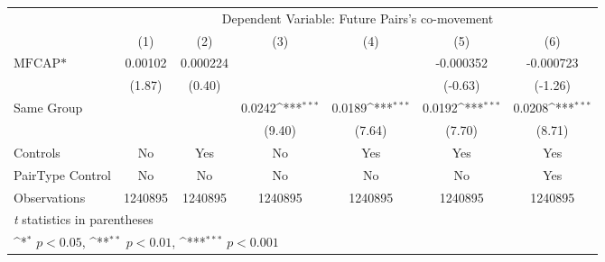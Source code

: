 {
\def\sym#1{\ifmmode^{#1}\else\(^{#1}\)\fi}
\begin{tabular}{l*{6}{c}}
\hline\hline
                &\multicolumn{6}{c}{Dependent Variable:  Future Pairs's co-movement}                                              \\\cmidrule(lr){2-7}
                &\multicolumn{1}{c}{(1)}         &\multicolumn{1}{c}{(2)}         &\multicolumn{1}{c}{(3)}         &\multicolumn{1}{c}{(4)}         &\multicolumn{1}{c}{(5)}         &\multicolumn{1}{c}{(6)}         \\
\hline
$ \text{MFCAP*} $&  0.00102         & 0.000224         &                  &                  &-0.000352         &-0.000723         \\
                &   (1.87)         &   (0.40)         &                  &                  &  (-0.63)         &  (-1.26)         \\
[1em]
Same Group      &                  &                  &   0.0242\sym{***}&   0.0189\sym{***}&   0.0192\sym{***}&   0.0208\sym{***}\\
                &                  &                  &   (9.40)         &   (7.64)         &   (7.70)         &   (8.71)         \\
\hline
Controls        &       No         &      Yes         &       No         &      Yes         &      Yes         &      Yes         \\
PairType Control&       No         &       No         &       No         &       No         &       No         &      Yes         \\
Observations    &  1240895         &  1240895         &  1240895         &  1240895         &  1240895         &  1240895         \\
\hline\hline
\multicolumn{7}{l}{\footnotesize \textit{t} statistics in parentheses}\\
\multicolumn{7}{l}{\footnotesize \sym{*} \(p<0.05\), \sym{**} \(p<0.01\), \sym{***} \(p<0.001\)}\\
\end{tabular}
}
